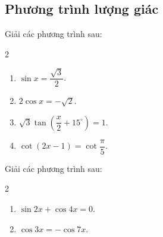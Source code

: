 \begin{bt}
\subsection{Phương trình lượng giác}
\begin{bt}%
	Giải các phương trình sau:
	\begin{multicols}{2}
		\begin{enumerate}
			\item $\sin x=\dfrac{\sqrt{3}}{2}$.
			\item $2\cos x=-\sqrt2$.
			\item $\sqrt3\tan\left(\dfrac{x}{2}+15^\circ \right)=1$.
			\item $\cot(2x-1)=\cot\dfrac{\pi}{5}$.
		\end{enumerate}
	\end{multicols}
\end{bt}
\begin{bt}%
	Giải các phương trình sau:
	\begin{multicols}{2}
		\begin{enumerate}
			\item $\sin 2x+\cos 4x=0$.
			\item $\cos 3x=-\cos 7x$.

\end{enumerate}
\end{multicols}
\end{bt}
\end{bt}
